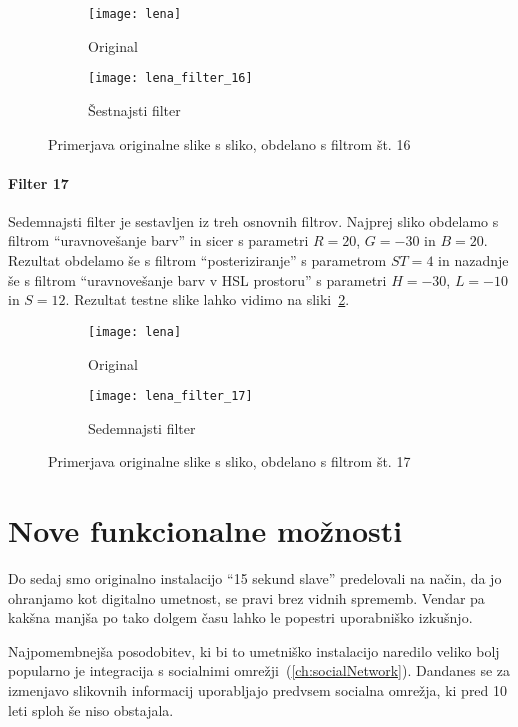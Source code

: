 \begin{figure}[!ht]
    \centering
    \begin{subfigure}[b]{0.4\textwidth}
        \texttt{[image: lena]}
        \caption{Original}
    \end{subfigure}
    \begin{subfigure}[b]{0.4\textwidth}
        \texttt{[image: lena\_filter\_16]}
        \caption{Šestnajsti filter}
    \end{subfigure}
    \caption{Primerjava originalne slike s sliko, obdelano s filtrom št. 16}
    \label{fig:lena_filter_16}
\end{figure}


\subsubsection*{Filter 17}
Sedemnajsti filter je sestavljen iz treh osnovnih filtrov. Najprej sliko obdelamo s
filtrom ``uravnovešanje barv'' in sicer s parametri $R = 20$, $G = -30$ in
$B = 20$. Rezultat obdelamo še s filtrom ``posteriziranje'' s parametrom
$ST= 4$ in nazadnje še s filtrom ``uravnovešanje barv v HSL prostoru'' s
parametri $H = -30$, $L = -10$ in $S = 12$. Rezultat testne slike lahko
vidimo na sliki~\ref{fig:lena_filter_17}.

\begin{figure}[!ht]
    \centering
    \begin{subfigure}[b]{0.4\textwidth}
        \texttt{[image: lena]}
        \caption{Original}
    \end{subfigure}
    \begin{subfigure}[b]{0.4\textwidth}
        \texttt{[image: lena\_filter\_17]}
        \caption{Sedemnajsti filter}
    \end{subfigure}
    \caption{Primerjava originalne slike s sliko, obdelano s filtrom št. 17}
    \label{fig:lena_filter_17}
\end{figure}


\chapter{Nove funkcionalne možnosti}
\label{ch:novosti}
Do sedaj smo originalno instalacijo ``15 sekund slave'' predelovali na način,
da jo ohranjamo kot digitalno umetnost, se pravi brez vidnih sprememb. Vendar
pa kakšna manjša po tako dolgem času lahko le popestri uporabniško izkušnjo.

Najpomembnejša posodobitev, ki bi to umetniško instalacijo naredilo veliko
bolj popularno je integracija s socialnimi omrežji~(\ref{ch:socialNetwork}).
Dandanes se za izmenjavo slikovnih informacij uporabljajo predvsem socialna
omrežja, ki pred 10 leti sploh še niso obstajala.



